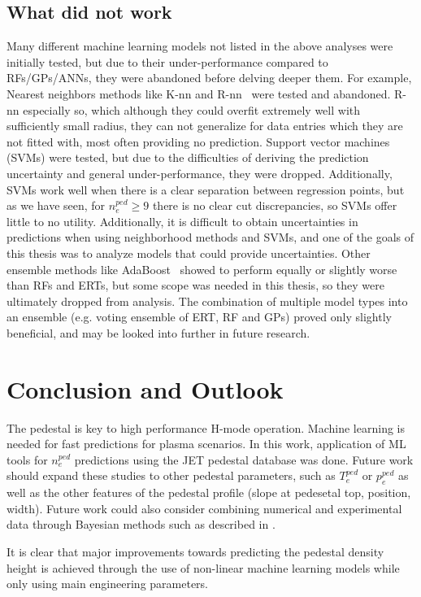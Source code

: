 \documentclass[a4paper, twoside, final, 12pt]{article}
\begin{document}
{\subsection{What did not work}
Many different machine learning models not listed in the above analyses were initially tested, but due to their under-performance compared to RFs/GPs/ANNs, they were abandoned before delving deeper them. For example, Nearest neighbors methods like K-nn and R-nn~\cite{Mucherino2009} were tested and abandoned. R-nn especially so, which although they could overfit extremely well with sufficiently small radius, they can not generalize for data entries which they are not fitted with, most often providing no prediction. Support vector machines (SVMs) \cite{hastie01statisticallearning} were tested, but due to the difficulties of deriving the prediction uncertainty and general under-performance, they were dropped. Additionally, SVMs work well when there is a clear separation between regression points, but as we have seen, for $n_e^{ped} \geq 9$ there is no clear cut discrepancies, so SVMs offer little to no utility. Additionally, it is difficult to obtain uncertainties in predictions when using neighborhood methods and SVMs, and one of the goals of this thesis was to analyze models that could provide uncertainties. Other ensemble methods like AdaBoost~\cite{schapire2013explaining} showed to perform equally or slightly worse than RFs and ERTs, but some scope was needed in this thesis, so they were ultimately dropped from analysis. The combination of multiple model types into an ensemble (e.g. voting ensemble of ERT, RF and GPs) proved only slightly beneficial, and may be looked into further in future research. 
\section{Conclusion and Outlook}
The pedestal is key to high performance H-mode operation. Machine learning is needed for fast predictions for plasma scenarios. In this work, application of ML tools for $n_e^{ped}$ predictions using the JET pedestal database was done. Future work should expand these studies to other pedestal parameters, such as $T_e^{ped} \text{ or } p_e^{ped}$ as well as the other features of the pedestal profile (slope at pedesetal top, position, width). Future work could also consider combining numerical and experimental data through Bayesian methods such as described in \cite{WU2018417}. 

It is clear that major improvements towards predicting the pedestal density height is achieved through the use of non-linear machine learning models while only using main engineering parameters.

}
\end{document}
